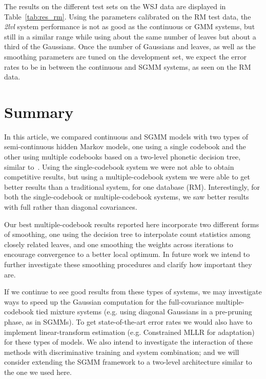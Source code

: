 \documentclass{article}
\begin{document}
The results on the different test sets on the WSJ data are displayed in
Table~\ref{tab:res_rm}.
Using the parameters calibrated on the RM test data, the {\em 2lvl} system
performance is not as good as the continuous or GMM systems, but still
in a similar range while using about the same number of leaves but about a
third of the Gaussians.
Once the number of Gaussians and leaves, as well as the smoothing parameters 
are tuned on the development set, we expect the error rates to be in between 
the continuous and SGMM systems, as seen on the RM data.

\section{Summary}
\label{sec:summary}

In this article, we compared continuous and SGMM models with
two types of semi-continuous hidden Markov models, one using a single codebook 
and the other using multiple codebooks based on a two-level phonetic decision tree,
similar to~\cite{prasad2004t2b}.
Using the single-codebook system we were not able to obtain competitive
results, but using a multiple-codebook system 
we were able to get better results than a traditional system, for one
database (RM).  Interestingly,
for both the single-codebook or multiple-codebook systems, we saw better
results with full rather than diagonal covariances.  

Our best multiple-codebook results reported here incorporate two different forms of 
smoothing, one using the decision tree to interpolate count statistics among closely
related leaves, and one smoothing the weights across iterations to encourage 
convergence to a better local optimum.  In future work we intend to further investigate
these smoothing procedures and clarify how important they are.

If we continue to see good results from these types of systems, 
we may investigate ways to speed up the Gaussian computation for the 
full-covariance multiple-codebook tied mixture systems (e.g. using
diagonal Gaussians in a pre-pruning phase, as in SGMMs).  To get state-of-the-art
error rates we would also have to 
implement linear-transform estimation (e.g. Constrained MLLR for adaptation)
for these types of models.  We also intend to investigate the interaction of these
methods with discriminative training and system combination; and we will
consider extending the SGMM framework to a two-level architecture similar to
the one we used here.





\end{document}
